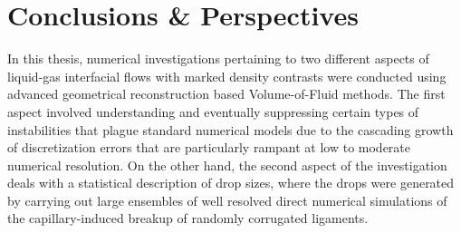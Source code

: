 \setchapterpreamble[u]{\margintoc}
\chapter{Conclusions \& Perspectives}

In this thesis, numerical investigations pertaining to two different aspects 
of liquid-gas interfacial flows with marked density contrasts were conducted 
using advanced geometrical reconstruction based Volume-of-Fluid methods. 
The first aspect involved understanding and eventually suppressing certain types of 
instabilities that plague standard numerical models due to the cascading growth of
discretization errors that are particularly rampant at low to moderate numerical resolution.  
On the other hand, the second aspect of the investigation deals with a statistical description
of drop sizes, where the drops were generated by carrying out large ensembles of well resolved 
direct numerical simulations of the capillary-induced breakup of randomly corrugated ligaments. 

